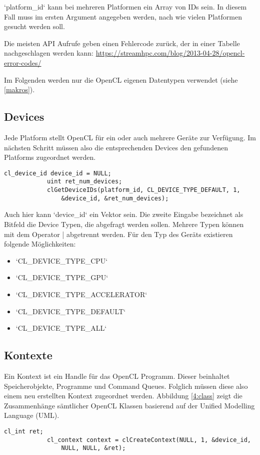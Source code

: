 			\li`platform_id` kann bei mehreren Platformen ein Array von IDs sein. In diesem Fall muss im ersten Argument angegeben werden, nach wie vielen Platformen gesucht werden soll.
			
			Die meisten \Gls{API} Aufrufe geben einen Fehlercode zurück, der in einer Tabelle nachgeschlagen werden kann: \url{https://streamhpc.com/blog/2013-04-28/opencl-error-codes/}
			
			Im Folgenden werden nur die OpenCL eigenen Datentypen verwendet (siehe \ref{makros}).
							
			\subsection{Devices}
			Jede \Gls{Platform} stellt OpenCL für ein oder auch mehrere Geräte zur Verfügung. Im nächsten Schritt müssen also die entsprechenden Devices den gefundenen \Glspl{Platform} zugeordnet werden.		
			\begin{lstlisting}[caption=~Deviceabfrage]
			cl_device_id device_id = NULL;	
			uint ret_num_devices;
			clGetDeviceIDs(platform_id, CL_DEVICE_TYPE_DEFAULT, 1, 
				&device_id, &ret_num_devices);
			\end{lstlisting}
			
			Auch hier kann \li`device_id` ein Vektor sein. Die zweite Eingabe bezeichnet als Bitfeld die Device Typen, die abgefragt werden sollen. Mehrere Typen können mit dem Operator | abgetrennt werden. Für den Typ des Geräts existieren folgende Möglichkeiten:
						
			\begin{itemize}		
			\item \li`CL_DEVICE_TYPE_CPU`	
			\item \li`CL_DEVICE_TYPE_GPU`		
			\item \li`CL_DEVICE_TYPE_ACCELERATOR`		
			\item \li`CL_DEVICE_TYPE_DEFAULT`			
			\item \li`CL_DEVICE_TYPE_ALL`
			\end{itemize}
				
			\subsection{Kontexte}
			Ein \Gls{Kontext} ist ein \Gls{Handle} für das OpenCL Programm. Dieser beinhaltet Speicherobjekte, Programme und Command Queues. Folglich müssen diese also einem neu erstellten \Gls{Kontext} zugeordnet werden. Abbildung \ref{4:class} zeigt die Zusammenhänge sämtlicher OpenCL Klassen \autocite{oclRC} basierend auf der Unified Modelling Language (UML). \autocite{uml}
			\begin{lstlisting}[caption=~Kontexte]
			cl_int ret;
			cl_context context = clCreateContext(NULL, 1, &device_id, 
				NULL, NULL, &ret);	
			\end{lstlisting}
			
